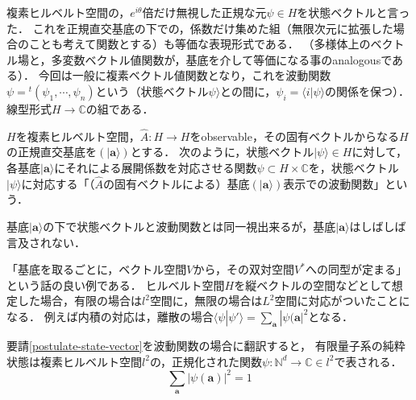 \documentclass[uplatex, dvipdfmx]{jsreport}
\begin{document}
複素ヒルベルト空間の，$e^{i\theta}$倍だけ無視した正規な元$\psi\in H$を状態ベクトルと言った．
これを正規直交基底の下での，係数だけ集めた組（無限次元に拡張した場合のことも考えて関数とする）も等価な表現形式である．
（多様体上のベクトル場と，多変数ベクトル値関数が，基底を介して等価になる事のanalogousである）．
今回は一般に複素ベクトル値関数となり，これを波動関数$\psi={}^t(\psi_1,\cdots,\psi_n)$という（状態ベクトル$\psi\rangle$との間に，$\psi_i=\langle i|\psi\rangle$の関係を保つ）．線型形式$H\to\mathbb{C}$の組である．
\begin{definition}\label{def-wave-function}
    $H$を複素ヒルベルト空間，$\hat{A}:H\to H$をobservable，その固有ベクトルからなる$H$の正規直交基底を$(|\mathbf{a}\rangle)$とする．
    次のように，状態ベクトル$|\psi\rangle\in H$に対して，各基底$|\mathbf{a}\rangle$にそれによる展開係数を対応させる関数$\psi\subset H\times\mathbb{C}$を，状態ベクトル$|\psi\rangle$に対応する「（$\hat{A}$の固有ベクトルによる）基底$(|\mathbf{a}\rangle)$表示での波動関数」という．
    \begin{center}\end{center}
    基底$|\mathbf{a}\rangle$の下で状態ベクトルと波動関数とは同一視出来るが，基底$|\mathbf{a}\rangle$はしばしば言及されない．
\end{definition}
\begin{remark}
    「基底を取るごとに，ベクトル空間$V$から，その双対空間$V^*$への同型が定まる」という話の良い例である．
    ヒルベルト空間$H$を縦ベクトルの空間などとして想定した場合，有限の場合は$l^2$空間に，無限の場合は$L^2$空間に対応がついたことになる．
    例えば内積の対応は，離散の場合$\langle\psi|\psi'\rangle=\sum_\mathbf{a}|\psi(\mathbf{a}|^2$となる．
\end{remark}

\begin{axiom*}[波動関数の規格化条件]
    要請\ref{postulate-state-vector}を波動関数の場合に翻訳すると，
    有限量子系の純粋状態は複素ヒルベルト空間$l^2$の，正規化された関数$\psi:\mathbb{N}^d\to\mathbb{C}\in l^2$で表される．
    \[ \sum_\mathbf{a}|\psi(\mathbf{a})|^2=1 \]
\end{axiom*}
\end{document}
